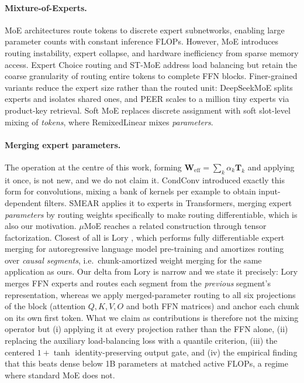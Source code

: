 \documentclass{article}
\begin{document}
\paragraph{Mixture-of-Experts.}
MoE architectures \citep{jacobs1991adaptive, shazeer2017outrageously, lepikhin2020gshard, fedus2022switch} route tokens to discrete expert subnetworks, enabling large parameter counts with constant inference FLOPs. However, MoE introduces routing instability, expert collapse, and hardware inefficiency from sparse memory access. Expert Choice routing \citep{zhou2022expertchoice} and ST-MoE \citep{zoph2022stmoe} address load balancing but retain the coarse granularity of routing entire tokens to complete FFN blocks. Finer-grained variants reduce the expert size rather than the routed unit: DeepSeekMoE \citep{dai2024deepseekmoe} splits experts and isolates shared ones, and PEER \citep{he2024peer} scales to a million tiny experts via product-key retrieval. Soft MoE \citep{puigcerver2024softmoe} replaces discrete assignment with soft slot-level mixing of \emph{tokens}, where RemixedLinear mixes \emph{parameters}.

\paragraph{Merging expert parameters.}
The operation at the centre of this work, forming $\mathbf{W}_\text{eff} = \sum_k \alpha_k \mathbf{T}_k$ and applying it once, is not new, and we do not claim it. CondConv \citep{yang2019condconv} introduced exactly this form for convolutions, mixing a bank of kernels per example to obtain input-dependent filters. SMEAR \citep{muqeeth2024smear} applies it to experts in Transformers, merging expert \emph{parameters} by routing weights specifically to make routing differentiable, which is also our motivation. $\mu$MoE \citep{oldfield2024mumoe} reaches a related construction through tensor factorization. Closest of all is Lory \citep{zhong2024lory}, which performs fully differentiable expert merging for autoregressive language model pre-training and amortizes routing over \emph{causal segments}, i.e.\ chunk-amortized weight merging for the same application as ours. Our delta from Lory is narrow and we state it precisely: Lory merges FFN experts and routes each segment from the \emph{previous} segment's representation, whereas we apply merged-parameter routing to all six projections of the block (attention $Q,K,V,O$ and both FFN matrices) and anchor each chunk on its own first token. What we claim as contributions is therefore not the mixing operator but (i) applying it at every projection rather than the FFN alone, (ii) replacing the auxiliary load-balancing loss with a quantile criterion, (iii) the centered $1+\tanh$ identity-preserving output gate, and (iv) the empirical finding that this beats dense below 1B parameters at matched active FLOPs, a regime where standard MoE does not.
\end{document}

